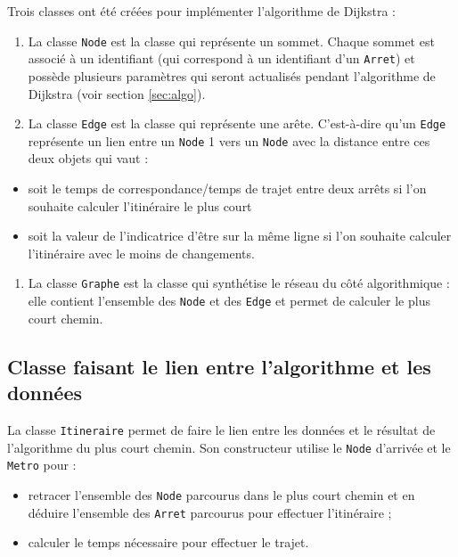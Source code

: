 \documentclass[,french]{article}
\providecommand{\tightlist}{%
  \setlength{\itemsep}{0pt}\setlength{\parskip}{0pt}}
\begin{document}
Trois classes ont été créées pour implémenter l'algorithme de Dijkstra :

\begin{enumerate}
\def\labelenumi{\arabic{enumi}.}
\item
  La classe \texttt{Node} est la classe qui représente un sommet. Chaque
  sommet est associé à un identifiant (qui correspond à un identifiant
  d'un \texttt{Arret}) et possède plusieurs paramètres qui seront
  actualisés pendant l'algorithme de Dijkstra (voir section
  \ref{sec:algo}).
\item
  La classe \texttt{Edge} est la classe qui représente une arête.
  C'est-à-dire qu'un \texttt{Edge} représente un lien entre un
  \texttt{Node} 1 vers un \texttt{Node} avec la distance entre ces deux
  objets qui vaut :
\end{enumerate}

\begin{itemize}
\tightlist
\item
  soit le temps de correspondance/temps de trajet entre deux arrêts si
  l'on souhaite calculer l'itinéraire le plus court
\item
  soit la valeur de l'indicatrice d'être sur la même ligne si l'on
  souhaite calculer l'itinéraire avec le moins de changements.
\end{itemize}

\begin{enumerate}
\def\labelenumi{\arabic{enumi}.}
\setcounter{enumi}{2}
\tightlist
\item
  La classe \texttt{Graphe} est la classe qui synthétise le réseau du
  côté algorithmique : elle contient l'ensemble des \texttt{Node} et des
  \texttt{Edge} et permet de calculer le plus court chemin.
\end{enumerate}

\hypertarget{classe-faisant-le-lien-entre-lalgorithme-et-les-donnuxe9es}{%
\subsection{Classe faisant le lien entre l'algorithme et les
données}\label{classe-faisant-le-lien-entre-lalgorithme-et-les-donnuxe9es}}

La classe \texttt{Itineraire} permet de faire le lien entre les données
et le résultat de l'algorithme du plus court chemin. Son constructeur
utilise le \texttt{Node} d'arrivée et le \texttt{Metro} pour :

\begin{itemize}
\item
  retracer l'ensemble des \texttt{Node} parcourus dans le plus court
  chemin et en déduire l'ensemble des \texttt{Arret} parcourus pour
  effectuer l'itinéraire ;
\item
  calculer le temps nécessaire pour effectuer le trajet.
\end{itemize}
\end{document}
